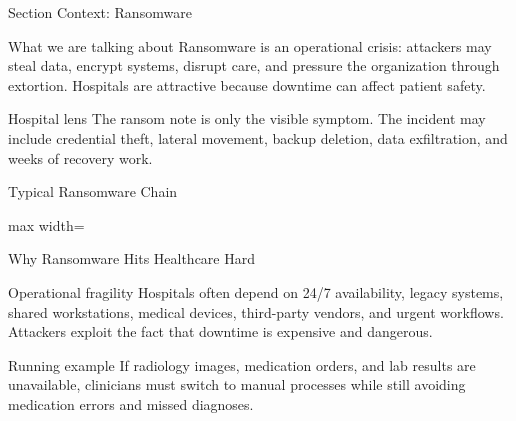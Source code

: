 \documentclass[presentation]{beamer}
\begin{document}
\begin{frame}[c]{Section Context: Ransomware}
\begin{block}{What we are talking about}
Ransomware is an operational crisis: attackers may steal data, encrypt systems, disrupt care, and
pressure the organization through extortion. Hospitals are attractive because downtime can affect
patient safety.
\end{block}

\begin{exampleblock}{Hospital lens}
The ransom note is only the visible symptom. The incident may include credential theft, lateral
movement, backup deletion, data exfiltration, and weeks of recovery work.
\end{exampleblock}
\end{frame}

\begin{frame}[c]{Typical Ransomware Chain}
\begin{center}
\begin{adjustbox}{max width=\textwidth}
\end{adjustbox}
\end{center}
\end{frame}

\begin{frame}[c]{Why Ransomware Hits Healthcare Hard}
\begin{block}{Operational fragility}
Hospitals often depend on 24/7 availability, legacy systems, shared workstations, medical devices,
third-party vendors, and urgent workflows. Attackers exploit the fact that downtime is expensive and
dangerous.
\end{block}

\begin{exampleblock}{Running example}
If radiology images, medication orders, and lab results are unavailable, clinicians must switch to
manual processes while still avoiding medication errors and missed diagnoses.
\end{exampleblock}
\end{frame}
\end{document}
